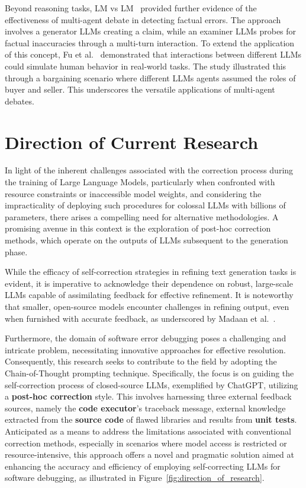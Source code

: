 \documentclass[a4paper,oneside]{book}
\begin{document}
Beyond reasoning tasks, LM vs LM~\cite{cohen2023lm} provided further evidence of the effectiveness of multi-agent debate in detecting factual errors. The approach involves a generator LLMs creating a claim, while an examiner LLMs probes for factual inaccuracies through a multi-turn interaction. To extend the application of this concept, Fu et al.~\cite{fu2023improving} demonstrated that interactions between different LLMs could simulate human behavior in real-world tasks. The study illustrated this through a bargaining scenario where different LLMs agents assumed the roles of buyer and seller. This underscores the versatile applications of multi-agent debates.

\section{Direction of Current Research}
In light of the inherent challenges associated with the correction process during the training of Large Language Models, particularly when confronted with resource constraints or inaccessible model weights, and considering the impracticality of deploying such procedures for colossal LLMs with billions of parameters, there arises a compelling need for alternative methodologies. A promising avenue in this context is the exploration of post-hoc correction methods, which operate on the outputs of LLMs subsequent to the generation phase.

While the efficacy of self-correction strategies in refining text generation tasks is evident, it is imperative to acknowledge their dependence on robust, large-scale LLMs capable of assimilating feedback for effective refinement. It is noteworthy that smaller, open-source models encounter challenges in refining output, even when furnished with accurate feedback, as underscored by Madaan et al.~\cite{madaan2023selfrefine}.

Furthermore, the domain of software error debugging poses a challenging and intricate problem, necessitating innovative approaches for effective resolution. Consequently, this research seeks to contribute to the field by adopting the Chain-of-Thought prompting technique. Specifically, the focus is on guiding the self-correction process of closed-source LLMs, exemplified by ChatGPT, utilizing a \textbf{post-hoc correction} style. This involves harnessing three external feedback sources, namely the \textbf{code executor}'s traceback message, external knowledge extracted from the \textbf{source code} of flawed libraries and results from \textbf{unit tests}. Anticipated as a means to address the limitations associated with conventional correction methods, especially in scenarios where model access is restricted or resource-intensive, this approach offers a novel and pragmatic solution aimed at enhancing the accuracy and efficiency of employing self-correcting LLMs for software debugging, as illustrated in Figure~\ref{fig:direction_of_research}.
\end{document}

